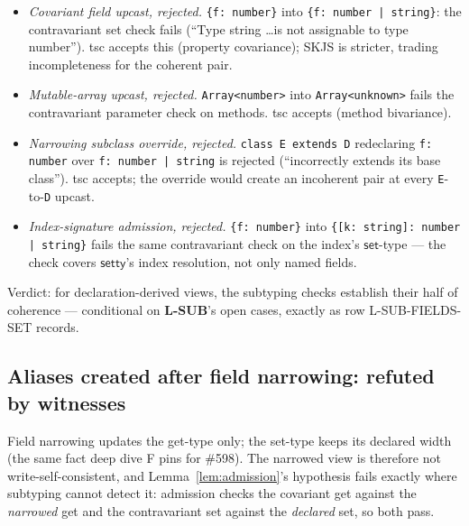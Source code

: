 \documentclass[11pt]{article}
\newcommand{\setty}{\mathsf{setty}}
\begin{document}
\begin{itemize}
\item \emph{Covariant field upcast, rejected.} \texttt{\{f: number\}}
  into \texttt{\{f: number | string\}}: the contravariant set check
  fails (``Type string \ldots is not assignable to type number''). tsc
  accepts this (property covariance); SKJS is stricter, trading
  incompleteness for the coherent pair.
\item \emph{Mutable-array upcast, rejected.}
  \texttt{Array<number>} into \texttt{Array<unknown>} fails the
  contravariant parameter check on methods. tsc accepts (method
  bivariance).
\item \emph{Narrowing subclass override, rejected.} \texttt{class E
  extends D} redeclaring \texttt{f: number} over \texttt{f: number |
  string} is rejected (``incorrectly extends its base class''). tsc
  accepts; the override would create an incoherent pair at every
  \texttt{E}-to-\texttt{D} upcast.
\item \emph{Index-signature admission, rejected.} \texttt{\{f:
  number\}} into \texttt{\{[k: string]: number | string\}} fails the
  same contravariant check on the index's $\mathsf{set}$-type — the
  check covers $\setty$'s index resolution, not only named fields.
\end{itemize}

Verdict: for declaration-derived views, the subtyping checks establish
their half of coherence — conditional on \textbf{L-SUB}'s open cases,
exactly as row L-SUB-FIELDS-SET records.

\subsection{Aliases created after field narrowing: refuted by witnesses}
\label{sec:narrowing}

Field narrowing updates the get-type only; the set-type keeps its
declared width (the same fact deep dive F pins for \#598). The narrowed
view is therefore not write-self-consistent, and
Lemma~\ref{lem:admission}'s hypothesis fails exactly where subtyping
cannot detect it: admission checks the covariant get against the
\emph{narrowed} get and the contravariant set against the
\emph{declared} set, so both pass.
\end{document}
